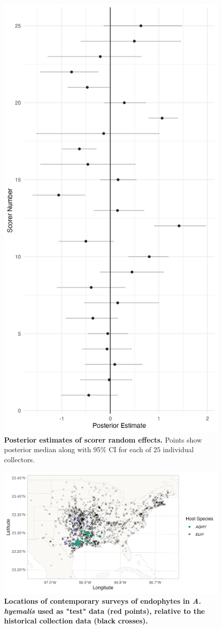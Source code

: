 \documentclass[11pt]{article}
\begin{document}
\begin{figure}[H]
	\centering
	\includegraphics[width = .6\linewidth]{../Plots/scorer_posterior.png}
	\caption{\textbf{Posterior estimates of scorer random effects.} Points show posterior median along with 95\% CI for each of $25$ individual collectors.}
	\label{fig:scorer_fx}
\end{figure}


\begin{figure}[H]
	\centering
	\includegraphics[width = \linewidth]{../Plots/contemp_surveys_map.png}
	\caption{\textbf{Locations of contemporary surveys of endophytes in \emph{A. hyemalis} used as "test" data (red points), relative to the historical collection data (black crosses).}}
	\label{fig:contempsurveysmap}
\end{figure}
\end{document}
